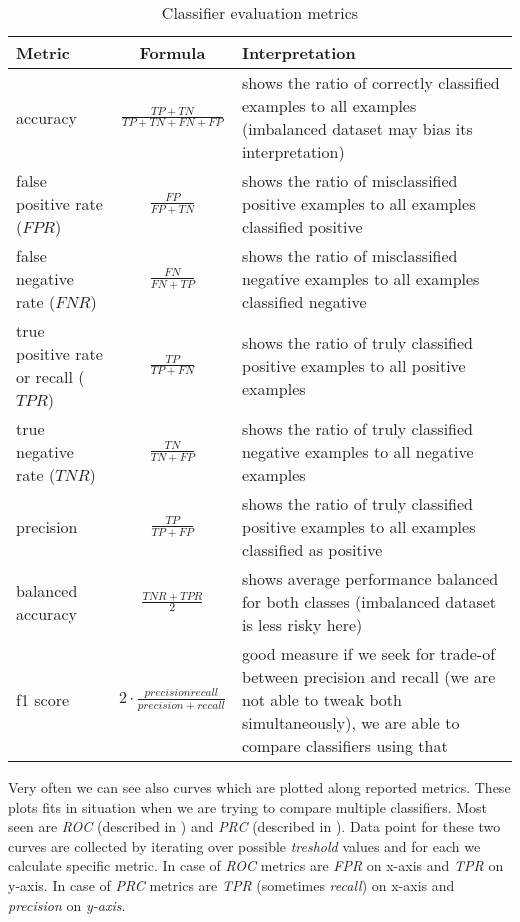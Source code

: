 \begin{table}[h]
    \centering
    \caption{Classifier evaluation metrics}
    \begin{minipage}{\linewidth}
    \begin{tabular}{lcp{5cm}}
      \toprule
      \textbf{Metric} &
      \textbf{Formula} &
      \textbf{Interpretation}
      \\
      \midrule
      accuracy & $\frac{TP+TN}{TP+TN+FN+FP}$ & shows the ratio of correctly classified examples to all examples (imbalanced dataset may bias its interpretation)\\
      \midrule
      false positive rate ($FPR$) & $\frac{FP}{FP+TN}$ & shows the ratio of misclassified positive examples to all examples classified positive \\
      \midrule
      false negative rate ($FNR$) & $\frac{FN}{FN+TP}$ &  shows the ratio of misclassified negative examples to all examples classified negative \\
      \midrule
      true positive rate or recall ($TPR$) & $\frac{TP}{TP+FN}$ & shows the ratio of truly classified positive examples to all positive examples  \\
      \midrule
      true negative rate ($TNR$) & $\frac{TN}{TN+FP}$ & shows the ratio of truly classified negative examples to all negative examples \\
      \midrule
      precision & $\frac{TP}{TP+FP}$ & shows the ratio of truly classified positive examples to all examples classified as positive \\
      \midrule
      balanced accuracy &$\frac{TNR+TPR}{2}$ & shows average performance balanced for both classes (imbalanced dataset is less risky here) \\
      \midrule
      f1 score & $2 \cdot \frac{precision \dot recall}{precision+recall}$ & good measure if we seek for trade-of between precision and recall (we are not able to tweak both simultaneously), we are able to compare classifiers using that\\
      \bottomrule
    \end{tabular}
    \end{minipage}
    \label{tab:metrics}
  \end{table}

Very often we can see also curves which are plotted along reported metrics. These plots fits in situation when we are trying to compare multiple classifiers. Most seen are \emph{ROC} (described in \cite{Fawcett2006}) and \emph{PRC} (described in \cite{Flach2015}). Data point for these two curves are collected by iterating over possible \emph{treshold} values and for each we calculate specific metric. In case of \emph{ROC} metrics are \emph{FPR} on x-axis and \emph{TPR} on y-axis. In case of \emph{PRC} metrics are \emph{TPR} (sometimes \emph{recall}) on x-axis and \emph{precision} on \emph{y-axis}.

